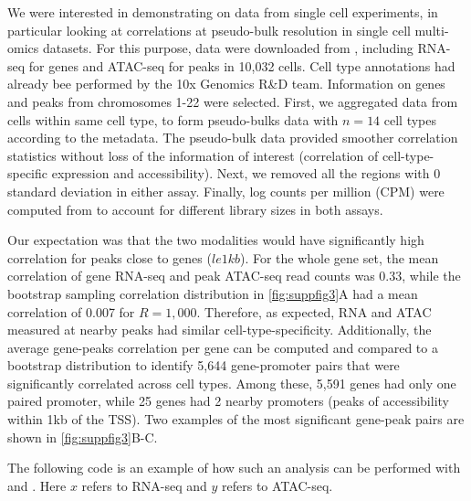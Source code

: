 \documentclass{article}
\begin{document}
We were interested in demonstrating \bootranges on data from single
cell experiments, in particular looking at correlations at
pseudo-bulk resolution in single cell multi-omics datasets.
For this purpose, 
data were downloaded from \citet{Vignette}, including
RNA-seq for genes and ATAC-seq for peaks in 10,032 cells.
Cell type annotations had already bee performed
by the 10x Genomics R\&D team. Information on genes and peaks from
chromosomes 1-22 were selected.
First, we aggregated data from cells within same cell type, to form
pseudo-bulks data with $n=14$ cell types according to the metadata. 
The pseudo-bulk data provided smoother correlation statistics without
loss of the information of interest (correlation of cell-type-specific
expression and accessibility).
Next, we removed all the regions with 0
standard deviation in either assay.
Finally, log counts per million (CPM) were computed
from  \citep{edgeR2010Robinson} to account for different library sizes
in both assays.

Our expectation was that the two modalities would have
significantly high correlation for peaks close to genes ($le 1kb$).
For the whole gene set, the mean
correlation of gene RNA-seq and peak ATAC-seq read counts was 0.33, while the
bootstrap sampling correlation distribution in \cref{fig:suppfig3}A
had a mean correlation of 0.007 for $R = 1,000$.
Therefore, as expected, RNA and ATAC
measured at nearby peaks had similar cell-type-specificity.
Additionally, the average gene-peaks correlation per gene can be
computed and compared to a bootstrap distribution to identify 5,644
gene-promoter pairs that were significantly correlated across cell
types. Among these, 5,591 genes had only one paired promoter, while 25
genes had 2 nearby promoters (peaks of accessibility within 1kb of the
TSS).  
Two examples of the most significant gene-peak pairs are shown in
\cref{fig:suppfig3}B-C.

The following code is an example of how such an analysis can be
performed with \bootranges and \plyranges. Here $x$ refers to RNA-seq and $y$ refers to ATAC-seq.
\end{document}
